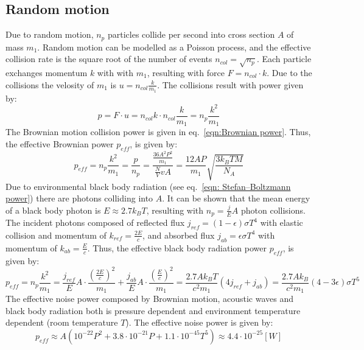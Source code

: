 \documentclass[\main/master.tex]{subfiles}
\begin{document}
\subsection{Random motion}
Due to random motion, $n_p$ particles collide per second into cross section $A$ of mass $m_1$. Random motion can be modelled as a Poisson process, and the effective collision rate is the square root of the number of events $n_{col} = \sqrt{n_p}$. Each particle exchanges momentum $k$ with with $m_1$, resulting with force $F = n_{col}\cdot k$. Due to the collisions the velosity of $m_1$ is $ u = n_{col}\frac{k}{m_1}$. The collisions result with power given by:
\begin{equation}
p = F\cdot u =  n_{col}k \cdot n_{col}\frac{k}{m_1} =  n_p\frac{ k^2}{m_1}
\label{eqn:net power}
\end{equation}
The Brownian motion collision power is given in eq.~\ref{eqn:Brownian power}. Thus, the effective Brownian power $p_{eff}$, is given by:
\begin{equation}
p_{eff} =  n_p\frac{ k^2}{m_1} = \frac{p}{n_p} = \frac{\frac{36A^2P^2}{m_1}}{\frac{N}{V}v A} = \frac{12AP}{m_1}\sqrt{\frac{3 k_B T M}{ N_A }}
\label{eqn:Brownian net power}
\end{equation}
Due to environmental black body radiation (see eq.~\ref{eqn: Stefan–Boltzmann power}) there are photons colliding into $A$. It can be shown that the mean energy of a black body photon is $E\approx 2.7k_B T$, resulting with $n_p = \frac{j}{E}A$ photon collisions. The incident photons composed of reflected flux $j_{ref}=(1-\epsilon)\sigma T^4$ with elastic collision and momentum of $k_{ref} = \frac{2E}{c} $, and absorbed flux $j_{ab}=\epsilon\sigma T^4$ with momentum of $k_{ab} = \frac{E}{c}$. Thus, the effective black body radiation power $p_{eff}$, is given by:
\begin{equation}
p_{eff} =  n_p\frac{ k^2}{m_1} = \frac{j_{ref}}{E}A\cdot\frac{ (\frac{2E}{c})^2}{m_1} +\frac{j_{ab}}{E}A\cdot\frac{ (\frac{E}{c})^2}{m_1} = \frac{  2.7 A k_B T }{ c^2 m_1} (4j_{ref}+j_{ab}) =\frac{2.7A k_B}{ c^2 m_1} (4-3\epsilon)\sigma T^5 
\label{eqn:photon collision power}
\end{equation}
The effective noise power composed by Brownian motion, acoustic waves and black body radiation both is pressure dependent and  environment temperature dependent (room temperature $T$). The effective noise power is given by:
\begin{equation}
p_{eff}  \approx A (10^{-22}P^2+ 3.8\cdot 10^{-21}P +1.1\cdot 10^{-45}T^5) \approx 4.4\cdot 10^{-25}  [W]
\label{eqn:net power}
\end{equation} 
\end{document}

